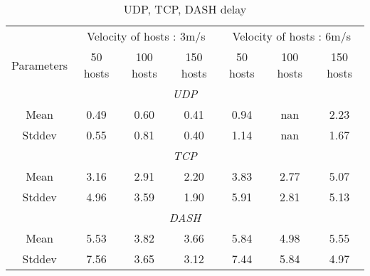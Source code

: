 \documentclass[12pt]{article}
\begin{document}
\begin{table}[h!] 
  \centering
  \caption{UDP, TCP, DASH delay}
  \begin{tabular}{c|ccc|ccc}
    \hline
    \multicolumn{1}{c}{} & \multicolumn{3}{c}{Velocity of hosts : 3m/s} & \multicolumn{3}{c}{Velocity of hosts : 6m/s} 			\\ 
    Parameters             & 50 hosts      & 100 hosts     & 150 hosts     &   50 hosts      & 100 hosts     & 150 hosts     		\\ 
    \hline
    \hline
    \multicolumn{7}{c}{\textit{UDP}} \\
    \hline
    \hline
    Mean         & 0.49     & 0.60   & 0.41   &    0.94  & nan    &  2.23  \\
    Stddev       & 0.55    & 0.81   & 0.40   &    1.14  & nan    &  1.67  \\
    \hline
    \hline
    \multicolumn{7}{c}{\textit{TCP}} \\
    \hline
    \hline
    Mean         & 3.16   & 2.91   & 2.20   &    3.83  & 2.77    &  5.07  \\
    Stddev       & 4.96   & 3.59   & 1.90   &    5.91  & 2.81    &  5.13  \\
    \hline
    \hline
    \multicolumn{7}{c}{\textit{DASH}} \\
    \hline
    \hline
      Mean         & 5.53   & 3.82   & 3.66   &    5.84  & 4.98    &  5.55  \\
      Stddev       & 7.56  & 3.65   & 3.12   &    7.44  & 5.84    &  4.97  \\
    \hline
  \end{tabular}
  \label{tab:tabledelay}
\end{table}
\FloatBarrier

	
\end{document}

